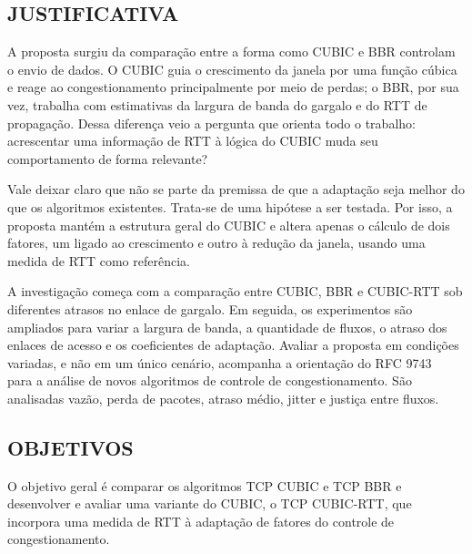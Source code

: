 \documentclass[a4paper,12pt]{monografia}
\begin{document}
\subsection{JUSTIFICATIVA}
A proposta surgiu da comparação entre a forma como CUBIC e BBR controlam o envio de dados. O CUBIC guia o crescimento da janela por uma função cúbica e reage ao congestionamento principalmente por meio de perdas; o BBR, por sua vez, trabalha com estimativas da largura de banda do gargalo e do RTT de propagação. Dessa diferença veio a pergunta que orienta todo o trabalho: acrescentar uma informação de RTT à lógica do CUBIC muda seu comportamento de forma relevante?

Vale deixar claro que não se parte da premissa de que a adaptação seja melhor do que os algoritmos existentes. Trata-se de uma hipótese a ser testada. Por isso, a proposta mantém a estrutura geral do CUBIC e altera apenas o cálculo de dois fatores, um ligado ao crescimento e outro à redução da janela, usando uma medida de RTT como referência.

A investigação começa com a comparação entre CUBIC, BBR e CUBIC-RTT sob diferentes atrasos no enlace de gargalo. Em seguida, os experimentos são ampliados para variar a largura de banda, a quantidade de fluxos, o atraso dos enlaces de acesso e os coeficientes de adaptação. Avaliar a proposta em condições variadas, e não em um único cenário, acompanha a orientação do RFC 9743~\cite{rfc9743} para a análise de novos algoritmos de controle de congestionamento. São analisadas vazão, perda de pacotes, atraso médio, jitter e justiça entre fluxos.

\subsection{OBJETIVOS}
O objetivo geral é comparar os algoritmos TCP CUBIC e TCP BBR e desenvolver e avaliar uma variante do CUBIC, o TCP CUBIC-RTT, que incorpora uma medida de RTT à adaptação de fatores do controle de congestionamento.
\end{document}
